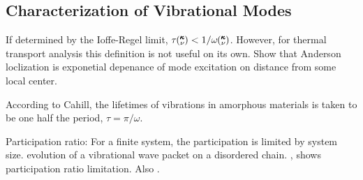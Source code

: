 \documentclass[aps,prb,preprint,superscriptaddress,amsmath,amssymb,floatfix]{revtex4}
\newcommand{\kv}{\mspace{-4.0mu}\left(\mspace{-8.0mu}
\begin{smallmatrix}&\pmb{\kappa} \\&\nu\end{smallmatrix}
\mspace{-3.0mu}\right)}
\begin{document}


\vspace*{100mm}

\subsection{\label{S:Lifetimes:}Characterization of Vibrational Modes}
If determined by the Ioffe-Regel limit, $\tau \kv < 1/\omega \kv$.
\cite{taraskin_determination_1999} However, for thermal transport 
analysis this definition is not useful on its own. Show that Anderson 
loclization is exponetial depenance of mode excitation on distance from 
some local center\cite{feldman_numerical_1999}.

According to Cahill, the lifetimes of vibrations in amorphous materials 
is taken to be one half the period, $\tau = \pi/\omega $.
\cite{cahill_heat_1989}

Participation ratio:
For a finite system, the participation is limited by system size.
evolution of a vibrational wave packet on a disordered chain.
\cite{allen_evolution_1998}, shows participation ratio limitation. Also 
\cite{garber_numerical_2001}.
\end{document}
